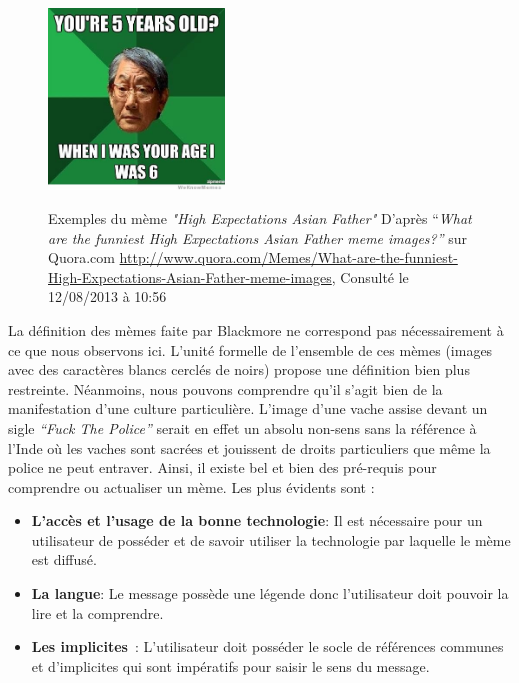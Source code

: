 \begin{figure}[htbp]
{        \includegraphics[width=1.8449in,height=1.9in]{figures/chap2/chapitre2-img13.jpg}
    }
    \caption[Mème ``High Expectations Asian Father'' d'après Quora.com]{Exemples du mème \textit{"High Expectations Asian Father"} D{\textquoteright}après {\textquotedblleft}\textit{What are the funniest High Expectations Asian Father meme images?{\textquotedblright}} sur Quora.com \url{http://www.quora.com/Memes/What-are-the-funniest-High-Expectations-Asian-Father-meme-images}, Consulté le 12/08/2013 à 10:56}
\end{figure}

La définition des mèmes faite par Blackmore ne correspond pas nécessairement à ce que nous observons ici. L{\textquoteright}unité formelle de l{\textquoteright}ensemble de ces mèmes (images avec des caractères blancs cerclés de noirs) propose une définition bien plus restreinte. Néanmoins, nous pouvons comprendre qu{\textquoteright}il s{\textquoteright}agit bien de la manifestation d{\textquoteright}une culture particulière. L{\textquoteright}image d{\textquoteright}une vache assise devant un sigle \textit{{\textquotedblleft}Fuck The Police{\textquotedblright} }serait en effet un absolu non-sens sans la référence à l{\textquoteright}Inde o\`u les vaches sont sacrées et jouissent de droits particuliers que même la police ne peut entraver. Ainsi, il existe bel et bien des pré-requis pour comprendre ou actualiser un mème. Les plus évidents sont :

\begin{itemize}
    \item \textbf{L’accès et l’usage de la bonne technologie}: Il est nécessaire pour un utilisateur de posséder et de savoir utiliser la technologie par laquelle le mème est diffusé.
    \item \textbf{La langue}: Le message possède une légende donc l’utilisateur doit pouvoir la lire et la comprendre.
    \item \textbf{Les implicites} : L’utilisateur doit posséder le socle de références communes et d’implicites qui sont impératifs pour saisir le sens du message. 
\end{itemize}

